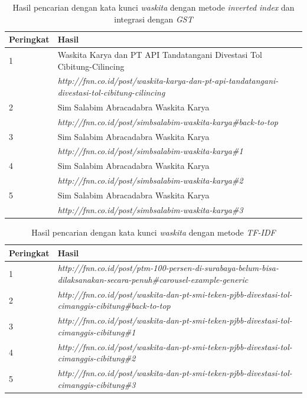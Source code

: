 \begin{table}[H]
\begin{center}
  \caption{\label{tabel:hasil_gst_waskita} Hasil pencarian dengan kata kunci
  \textit{waskita} dengan metode \textit{inverted index} dan integrasi dengan
  \textit{GST}}
  \begin{tabular}{|p{0.7in}|p{4.5in}|} 
 \hline
  Peringkat & Hasil \\ 
 \hline
  1 & Waskita Karya dan PT API Tandatangani Divestasi Tol Cibitung-Cilincing \\ 
   & \textit{http://fnn.co.id/post/waskita-karya-dan-pt-api-tandatangani-divestasi-tol-cibitung-cilincing} \\
 \hline
  2 & Sim Salabim Abracadabra Waskita Karya \\
   & \textit{http://fnn.co.id/post/simbsalabim-waskita-karya\#back-to-top} \\
 \hline
  3 & Sim Salabim Abracadabra Waskita Karya \\
   & \textit{http://fnn.co.id/post/simbsalabim-waskita-karya\#1} \\
 \hline
  4 & Sim Salabim Abracadabra Waskita Karya \\
   & \textit{http://fnn.co.id/post/simbsalabim-waskita-karya\#2} \\
 \hline
  5 & Sim Salabim Abracadabra Waskita Karya \\
   & \textit{http://fnn.co.id/post/simbsalabim-waskita-karya\#3} \\
 \hline
\end{tabular}
\end{center}
\end{table}

\begin{table}[H]
\begin{center}
  \caption{\label{tabel:hasil_tfidf_waskita} Hasil pencarian dengan kata kunci
  \textit{waskita} dengan metode \textit{TF-IDF}}
  \begin{tabular}{|p{0.7in}|p{4.5in}|} 
 \hline
  Peringkat & Hasil \\ 
 \hline
    1 & \textit{http://fnn.co.id/post/ptm-100-persen-di-surabaya-belum-bisa-dilaksanakan-secara-penuh\#carousel-example-generic} \\ 
 \hline
    2 & \textit{http://fnn.co.id/post/waskita-dan-pt-smi-teken-pjbb-divestasi-tol-cimanggis-cibitung\#back-to-top} \\
 \hline
    3 & \textit{http://fnn.co.id/post/waskita-dan-pt-smi-teken-pjbb-divestasi-tol-cimanggis-cibitung\#1} \\
 \hline
    4 & \textit{http://fnn.co.id/post/waskita-dan-pt-smi-teken-pjbb-divestasi-tol-cimanggis-cibitung\#2} \\
 \hline
    5 & \textit{http://fnn.co.id/post/waskita-dan-pt-smi-teken-pjbb-divestasi-tol-cimanggis-cibitung\#3} \\
 \hline
\end{tabular}
\end{center}
\end{table}

